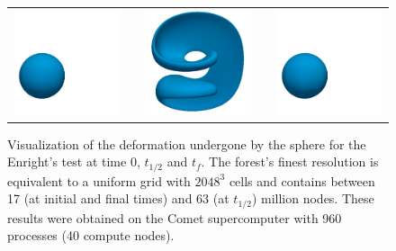 \begin{figure}[htbp]
\begin{center}
\begin{tabular}{ccccc}
\includegraphics[width=.28\textwidth]{figures/enright_blue_0.png}
&
\hspace{.1cm}
&
\includegraphics[width=.28\textwidth]{figures/enright_blue_1.png}
&
\hspace{.1cm}
&
\includegraphics[width=.28\textwidth]{figures/enright_blue_2.png}
\end{tabular}
\caption{Visualization of the deformation undergone by the sphere for the Enright's test at time 0, $t_{1/2}$ and $t_f$. The forest's finest resolution is equivalent to a uniform grid with $2048^3$ cells and contains between 17 (at initial and final times) and 63 (at $t_{1/2}$) million nodes. These results were obtained on the Comet supercomputer with 960 processes (40 compute nodes).} \label{fig:accuracy}
\end{center}
\end{figure}